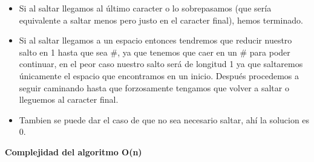 \documentclass[12pt]{article}
\begin{document}
    \begin{itemize}
        \item Si al saltar llegamos al último caracter o lo sobrepasamos (que sería equivalente a saltar menos pero
        justo en el caracter final), hemos terminado.
        \begin{figure}[h]
            \centering
        \end{figure}
        \item Si al saltar llegamos a un espacio entonces tendremos que reducir nuestro salto en 1 hasta que sea \#, ya que 
              tenemos que caer en un \# para poder continuar, en el peor caso nuestro salto será de longitud 1 ya que
              saltaremos únicamente el espacio que encontramos en un inicio.
              Después procedemos a seguir caminando hasta que forzosamente tengamos que volver a saltar o lleguemos 
              al caracter final.
        \begin{figure}[h]
            \centering
        \end{figure}
        \item Tambien se puede dar el caso de que no sea necesario saltar, ahí la solucion es 0.
    \end{itemize}
    
    \vspace{1cm}
    \begin{flushright}
        \textbf{ Complejidad del algoritmo O(n) }
    \end{flushright}
\end{document}
